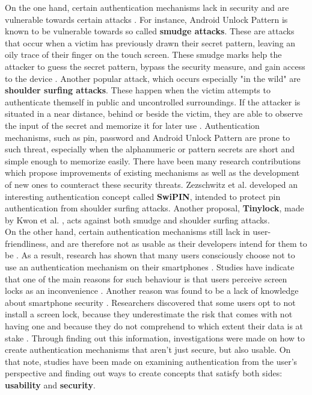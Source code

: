 On the one hand, certain authentication mechanisms lack in security and are vulnerable towards certain attacks \cite{Schloeglhofer}. For instance, Android Unlock Pattern is known to be vulnerable towards so called \textbf{smudge attacks}. These are attacks that occur when a victim has previously drawn their secret pattern, leaving an oily trace of their finger on the touch screen. These smudge marks help the attacker to guess the secret pattern, bypass the security measure, and gain access to the device \cite{ediss20251}. Another popular attack, which occurs especially "in the wild" are \textbf{shoulder surfing attacks}. These happen when the victim attempts to authenticate themself in public and uncontrolled surroundings. If the attacker is situated in a near distance, behind or beside the victim, they are able to observe the input of the secret and memorize it for later use \cite{ediss20251}. Authentication mechanisms, such as pin, password and Android Unlock Pattern are prone to such threat, especially when the alphanumeric or pattern secrets are short and simple enough to memorize easily. There have been many research contributions which propose improvements of existing mechanisms as well as the development of new ones to counteract these security threats. Zezschwitz et al. \cite{vonZezschwitz:2015:SFS:2702123.2702212} developed an interesting authentication concept called \textbf{SwiPIN}, intended to protect pin authentication from shoulder surfing attacks. Another proposal, \textbf{Tinylock}, made by Kwon et al. \cite{kwon}, acts against both smudge and shoulder surfing attacks. \\



On the other hand, certain authentication mechanisms still lack in user-friendliness, and are therefore not as usable as their developers intend for them to be \cite{Schloeglhofer}. As a result, research has shown that many users consciously choose not to use an authentication mechanism on their smartphones \cite{ediss20251, Albayram:2017:BUL:3235924.3235929, Egelman:2014:YRL:2660267.2660273}. Studies have indicate that one of the main reasons for such behaviour is that users perceive screen locks as an inconvenience \cite{Albayram:2017:BUL:3235924.3235929, ediss20251, harbach}. Another reason was found to be a lack of knowledge about smartphone security \cite{Albayram:2017:BUL:3235924.3235929, Adams:1999:UE:322796.322806}. Researchers discovered that some users opt to not install a screen lock, because they underestimate the risk that comes with not having one and because they do not comprehend to which extent their data is at stake \cite{Egelman:2014:YRL:2660267.2660273}. Through finding out this information, investigations were made on how to create authentication mechanisms that aren't just secure, but also usable. On that note, studies have been made on examining authentication from the user's perspective and finding out ways to create concepts that satisfy both sides: \textbf{usability} and \textbf{security}. 


